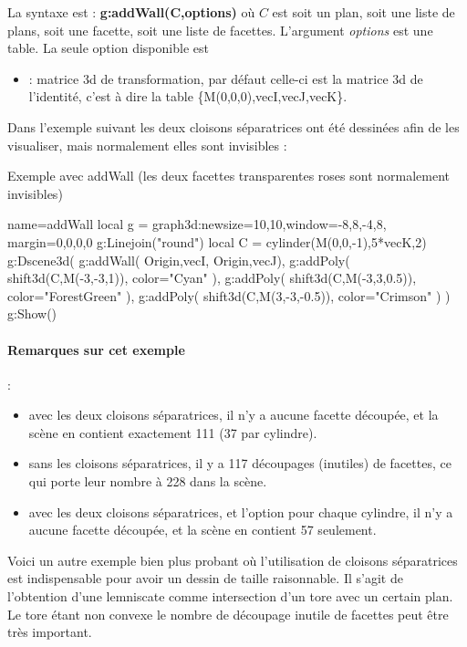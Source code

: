 La syntaxe est : \textbf{g:addWall(C,options)} où $C$ est soit un plan, soit une liste de plans, soit une facette, soit une liste de facettes. L'argument \emph{options} est une table. La seule option disponible est 
\begin{itemize}
    \item {} : matrice 3d de transformation, par défaut celle-ci est la matrice 3d de l'identité, c'est à dire la table \{M(0,0,0),vecI,vecJ,vecK\}.
\end{itemize}

Dans l'exemple suivant les deux cloisons séparatrices ont été dessinées afin de les visualiser, mais normalement elles sont invisibles :
\begin{demo}{Exemple avec addWall (les deux facettes transparentes roses sont normalement invisibles)}
\begin{luadraw}{name=addWall}
local g = graph3d:new{size={10,10},window={-8,8,-4,8}, margin={0,0,0,0}}
g:Linejoin("round")
local C = cylinder(M(0,0,-1),5*vecK,2)
g:Dscene3d(
    g:addWall( {{Origin,vecI}, {Origin,vecJ}}),
    g:addPoly( shift3d(C,M(-3,-3,1)), {color="Cyan"} ),
    g:addPoly( shift3d(C,M(-3,3,0.5)), {color="ForestGreen"} ),
    g:addPoly( shift3d(C,M(3,-3,-0.5)), {color="Crimson"} )
)
g:Show()
\end{luadraw}
\end{demo}
\paragraph{Remarques sur cet exemple} : 
\begin{itemize}
    \item avec les deux cloisons séparatrices, il n'y a aucune facette découpée, et la scène en contient exactement 111 (37 par cylindre).
    \item sans les cloisons séparatrices, il y a 117 découpages (inutiles) de facettes, ce qui porte leur nombre à 228 dans la scène.
        \item avec les deux cloisons séparatrices, et l'option  pour chaque cylindre, il n'y a aucune facette découpée, et la scène en contient 57 seulement.
\end{itemize}

Voici un autre exemple bien plus probant où l'utilisation de cloisons séparatrices est indispensable pour avoir un dessin de taille raisonnable. Il s'agit de l'obtention d'une lemniscate comme intersection d'un tore avec un certain plan. Le tore étant non convexe le nombre de découpage inutile de facettes peut être très important.

